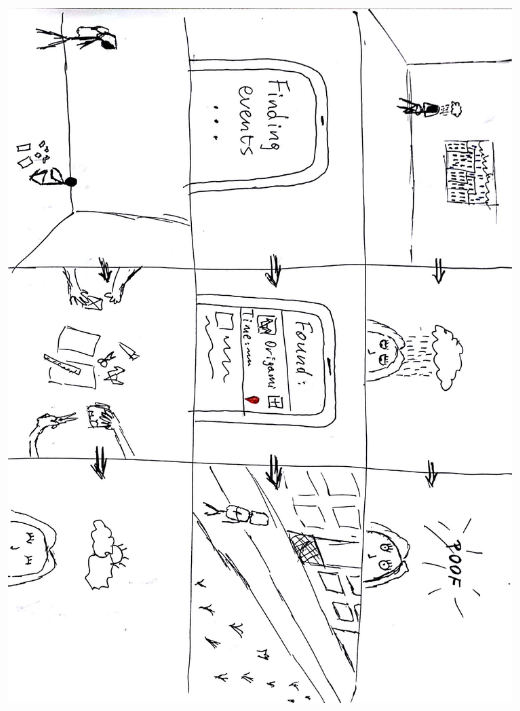 \documentclass[12pt]{report}
\begin{document}
	\includegraphics[width=\linewidth]{Story2.jpg}\break
	
\end{document}
